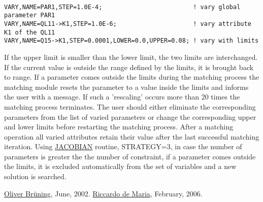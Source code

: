 \begin{verbatim}

VARY,NAME=PAR1,STEP=1.0E-4;                         ! vary global parameter PAR1 
VARY,NAME=QL11->K1,STEP=1.0E-6;                     ! vary attribute K1 of the QL11 
VARY,NAME=Q15->K1,STEP=0.0001,LOWER=0.0,UPPER=0.08; ! vary with limits
\end{verbatim} If the upper limit is smaller than the lower limit, the two limits are interchanged. If the current value is outside the range defined by the limits, it is brought back to range. If a parameter comes outside the limits during the matching process the matching module resets the parameter to a value inside the limits and informs the user with a message. If such a 'rescaling' occurs more than 20 times the matching process terminates. The user should either eliminate the corresponding parameters from the list of varied parameters or change the corresponding upper and lower limits before restarting the matching process. After a matching operation all varied attributes retain their value after the last successful matching iteration. Using \href{match_xeq.html#jacobian}{JACOBIAN} routine, STRATEGY=3, in case the number of parameters is greater the the number of constraint, if a parameter comes outside the limits, it is excluded automatically from the set of variables and a new solution is searched. 

\href{http://bruening.home.cern.ch/bruening/}{Oliver Br\"uning}, June, 2002. \href{http://rdemaria.home.cern.ch/rdemaria/}{Riccardo de Maria}, February, 2006. 


